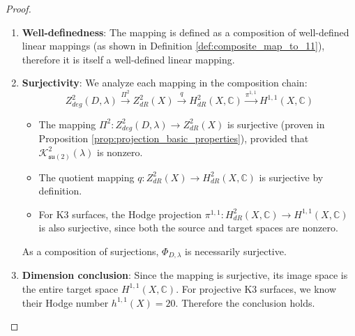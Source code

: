 \documentclass[a4paper,12pt]{extarticle}
\theoremstyle{plain}
\theoremstyle{definition}
\begin{document}
\begin{proof}
\begin{enumerate}
    \item \textbf{Well-definedness}: The mapping is defined as a composition of well-defined linear mappings (as shown in Definition \ref{def:composite_map_to_11}), therefore it is itself a well-defined linear mapping.

    \item \textbf{Surjectivity}: We analyze each mapping in the composition chain:
    $$ Z_{deg}^2(D,\lambda) \xrightarrow{\Pi^2} Z^2_{dR}(X) \xrightarrow{q} H^2_{dR}(X, \mathbb{C}) \xrightarrow{\pi^{1,1}} H^{1,1}(X, \mathbb{C}) $$
    \begin{itemize}
        \item The mapping $\Pi^2: Z_{deg}^2(D,\lambda) \to Z^2_{dR}(X)$ is surjective (proven in Proposition \ref{prop:projection_basic_properties}), provided that $\mathcal{K}_{\mathfrak{su}(2)}^2(\lambda)$ is nonzero.
        \item The quotient mapping $q: Z^2_{dR}(X) \to H^2_{dR}(X, \mathbb{C})$ is surjective by definition.
        \item For K3 surfaces, the Hodge projection $\pi^{1,1}: H^2_{dR}(X, \mathbb{C}) \to H^{1,1}(X, \mathbb{C})$ is also surjective, since both the source and target spaces are nonzero.
    \end{itemize}
    As a composition of surjections, $\Phi_{D,\lambda}$ is necessarily surjective.

    \item \textbf{Dimension conclusion}: Since the mapping is surjective, its image space is the entire target space $H^{1,1}(X, \mathbb{C})$. For projective K3 surfaces, we know their Hodge number $h^{1,1}(X)=20$. Therefore the conclusion holds.
\end{enumerate}
\end{proof}
\end{document}
